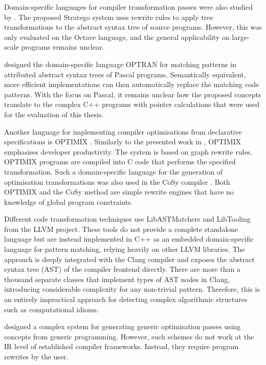     Domain-specific languages for compiler transformation passes were also
    studied by \citet{Olmos:2005:CSD:2136624.2136643}.
    The proposed Stratego system uses rewrite rules to apply tree
    transformations to the abstract syntax tree of source programs.
    However, this was only evaluated on the Octave language, and the general
    applicability on large-scale programs remains unclear.

    \citet{Lipps1989} designed the domain-specific language OPTRAN for matching
    patterns in attributed abstract syntax trees of Pascal programs.
    Semantically equivalent, more efficient implementations can then
    automatically replace the matching code patterns.
    With the focus on Pascal, it remains unclear how the proposed concepts
    translate to the complex C++ programs with pointer calculations that were
    used for the evaluation of this thesis.

    Another language for implementing compiler optimisations from
    declarative specifications is OPTIMIX \citep{Assmann1996,Assmann98optimix}.
    Similarly to the presented work in , OPTIMIX emphasises
    developer productivity.
    The system is based on graph rewrite rules.
    OPTIMIX programs are compiled into C code that performs the specified
    transformation.
    Such a domain-specific language for the generation of optimisation
    transformations was also used in the CoSy compiler \citep{Alt1994}.
    Both OPTIMIX and the CoSy method are simple rewrite engines that have no
    knowledge of global program constraints.

    Different code transformation techniques use LibASTMatchers
    and LibTooling \citep{be0fa11ddb194bde86a9dab8589b779c} from the
    LLVM project.
    These tools do not provide a complete standalone language but are instead
    implemented in C++ as an embedded domain-specific language for pattern
    matching, relying heavily on other LLVM libraries.
    The approach is deeply integrated with the Clang compiler and exposes the
    abstract syntax tree (AST) of the compiler frontend directly.
    There are more than a thousand separate classes that implement types
    of AST nodes in Clang, introducing considerable complexity for any
    non-trivial pattern.
    Therefore, this is an entirely impractical approach for detecting complex
    algorithmic structures such as computational idioms.

    \citet{Willcock:2009:RGP:1621607.1621611} designed a complex system for
    generating generic optimisation passes using concepts from generic
    programming.
    However, such schemes do not work at the IR level of established
    compiler frameworks.
    Instead, they require program rewrites by the user.

